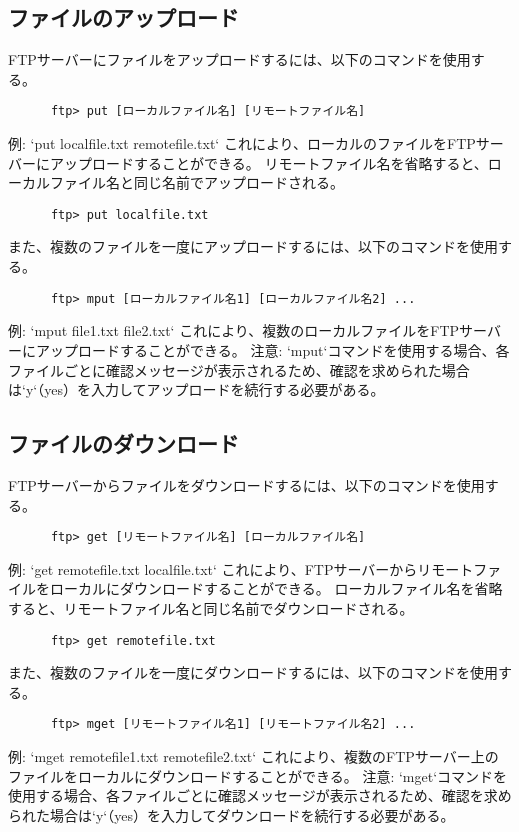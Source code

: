 \documentclass[a4paper,10pt]{jsarticle}
\begin{document}
    \subsection{ファイルのアップロード}
    FTPサーバーにファイルをアップロードするには、以下のコマンドを使用する。
    \begin{lstlisting}
      ftp> put [ローカルファイル名] [リモートファイル名]
    \end{lstlisting}
    例: `put localfile.txt remotefile.txt`
    これにより、ローカルのファイルをFTPサーバーにアップロードすることができる。
    リモートファイル名を省略すると、ローカルファイル名と同じ名前でアップロードされる。
    \begin{lstlisting}
      ftp> put localfile.txt
    \end{lstlisting}
    また、複数のファイルを一度にアップロードするには、以下のコマンドを使用する。
    \begin{lstlisting}
      ftp> mput [ローカルファイル名1] [ローカルファイル名2] ...
    \end{lstlisting}
    例: `mput file1.txt file2.txt`
    これにより、複数のローカルファイルをFTPサーバーにアップロードすることができる。
    注意: `mput`コマンドを使用する場合、各ファイルごとに確認メッセージが表示されるため、確認を求められた場合は`y`（yes）を入力してアップロードを続行する必要がある。

    \subsection{ファイルのダウンロード}
    FTPサーバーからファイルをダウンロードするには、以下のコマンドを使用する。
    \begin{lstlisting}
      ftp> get [リモートファイル名] [ローカルファイル名]
    \end{lstlisting}
    例: `get remotefile.txt localfile.txt`
    これにより、FTPサーバーからリモートファイルをローカルにダウンロードすることができる。
    ローカルファイル名を省略すると、リモートファイル名と同じ名前でダウンロードされる。
    \begin{lstlisting}
      ftp> get remotefile.txt
    \end{lstlisting}
    また、複数のファイルを一度にダウンロードするには、以下のコマンドを使用する。
    \begin{lstlisting}
      ftp> mget [リモートファイル名1] [リモートファイル名2] ...
    \end{lstlisting}
    例: `mget remotefile1.txt remotefile2.txt`
    これにより、複数のFTPサーバー上のファイルをローカルにダウンロードすることができる。
    注意: `mget`コマンドを使用する場合、各ファイルごとに確認メッセージが表示されるため、確認を求められた場合は`y`（yes）を入力してダウンロードを続行する必要がある。
\end{document}
